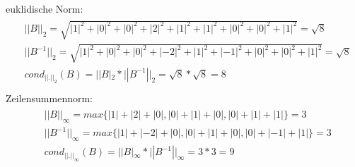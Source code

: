 euklidische Norm:
\begin{align*}
\begin{split}
&||B||_2=\sqrt{|1|^2+|0|^2+|0|^2+|2|^2+|1|^2+|1|^2+|0|^2+|0|^2+|1|^2}=\sqrt{8}\\
&||B^{-1}||_2=\sqrt{|1|^2+|0|^2+|0|^2+|-2|^2+|1|^2+|-1|^2+|0|^2+|0|^2+|1|^2}=\sqrt{8}\\
& cond_{||.||_2}(B)=||B|_2*||B^{-1}||_2=\sqrt{8}*\sqrt{8}=8\\
\end{split}
\end{align*}
Zeilensummennorm:
\begin{align*}
\begin{split}
&||B||_\infty = max\{|1|+|2|+|0|, |0|+|1|+|0|,|0|+|1|+|1|\} = 3\\
&||B^{-1}||_\infty = max\{|1|+|-2|+|0|, |0|+|1|+|0|,|0|+|-1|+|1|\} = 3\\
& cond_{||.||_\infty}(B)=||B|_\infty*||B^{-1}||_\infty = 3 * 3 = 9\\
\end{split}
\end{align*}